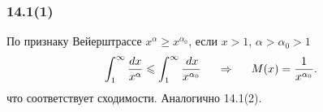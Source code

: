 \subsubsection{14.1(1)}

По признаку Вейерштрассе $x^\alpha \geq x^{\alpha_0}$, если $x > 1$, $\alpha > \alpha_0 > 1$
\begin{equation*}
    \int_1^{\infty} \frac{dx}{x^\alpha} \leqslant \int_1^{\infty} \frac{\, d x}{x^{\alpha_0}}
    \hspace{0.5cm} \Rightarrow \hspace{0.5cm}
    M(x) = \frac{1}{x^{\alpha_0}}.
\end{equation*}
что соответствует сходимости. Аналогично 14.1(2).
